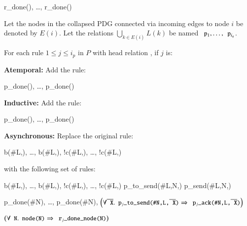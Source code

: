 \begin{Drules}
        {r_done(), \ldots, r_done()}
\end{Drules}

Let the nodes in the collapsed PDG connected via incoming edges to node $i$ be denoted by $E(i)$.  Let the relations $\bigcup_{k \in E(i)} L(k)$ be named $\dedalus{p}_1, \ldots, \dedalus{p}_{i_q}$.

For each rule $1 \leq j \leq i_p$ in $P$ with head relation , if $j$ is:

\noindent
\textbf{Atemporal:}
Add the rule:

\begin{Drules}
        {p_done(), \ldots, p_done()}
\end{Drules}

\noindent
\textbf{Inductive:}
Add the rule:

\begin{Drules}
        {p_done(), \ldots, p_done()}
\end{Drules}

\noindent
\textbf{Asynchronous:}
Replace the original rule:

\begin{Drules}
        {b(#L,), \ldots, b(#L,), !c(#L,), \ldots, !c(#L,)}
\end{Drules}

with the following set of rules:

\begin{Drules}
      {b(#L,), \ldots, b(#L,), !c(#L,), \ldots, !c(#L,)}
      {p_to_send(#L,N,)}
      {p_send(#L,N,)}

      {p_done(#N), \ldots, p_done(#N), \(\left(\forall \od{X} . \dedalus{p\sub{j}_to_send(#N,L,\od{X})} \Rightarrow \dedalus{p\sub{j}_ack(#N,L,\od{X})}\right)\)}

      {\(\left(\forall \dedalus{N} . \dedalus{node(N)} \Rightarrow \dedalus{r\sub{j}_done_node(N)}\right)\)}
\end{Drules}

